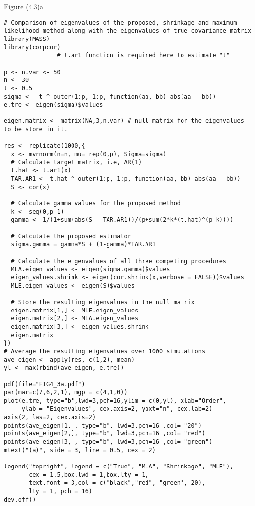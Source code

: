 Figure (4.3)a
\begin{lstlisting}
# Comparison of eigenvalues of the proposed, shrinkage and maximum likelihood method along with the eigenvalues of true covariance matrix 
library(MASS)
library(corpcor)
               # t.ar1 function is required here to estimate "t"

p <- n.var <- 50
n <- 30
t <- 0.5
sigma <-  t ^ outer(1:p, 1:p, function(aa, bb) abs(aa - bb))
e.tre <- eigen(sigma)$values

eigen.matrix <- matrix(NA,3,n.var) # null matrix for the eigenvalues to be store in it.

res <- replicate(1000,{
  x <- mvrnorm(n=n, mu= rep(0,p), Sigma=sigma)
  # Calculate target matrix, i.e, AR(1)
  t.hat <- t.ar1(x)
  TAR.AR1 <- t.hat ^ outer(1:p, 1:p, function(aa, bb) abs(aa - bb))
  S <- cor(x)
  
  # Calculate gamma values for the proposed method
  k <- seq(0,p-1)
  gamma <- 1/(1+sum(abs(S - TAR.AR1))/(p+sum(2*k*(t.hat)^(p-k))))
  
  # Calculate the proposed estimator
  sigma.gamma = gamma*S + (1-gamma)*TAR.AR1
  
  # Calculate the eigenvalues of all three competing procedures
  MLA.eigen_values <- eigen(sigma.gamma)$values
  eigen_values.shrink <- eigen(cor.shrink(x,verbose = FALSE))$values
  MLE.eigen_values <- eigen(S)$values
  
  # Store the resulting eigenvalues in the null matrix
  eigen.matrix[1,] <- MLE.eigen_values
  eigen.matrix[2,] <- MLA.eigen_values
  eigen.matrix[3,] <- eigen_values.shrink
  eigen.matrix
})
# Average the resulting eigenvalues over 1000 simulations
ave_eigen <- apply(res, c(1,2), mean)
yl <- max(rbind(ave_eigen, e.tre))

pdf(file="FIG4_3a.pdf")
par(mar=c(7,6,2,1), mgp = c(4,1,0))
plot(e.tre, type="b",lwd=3,pch=16,ylim = c(0,yl), xlab="Order",
     ylab = "Eigenvalues", cex.axis=2, yaxt="n", cex.lab=2)
axis(2, las=2, cex.axis=2)
points(ave_eigen[1,], type="b", lwd=3,pch=16 ,col= "20")
points(ave_eigen[2,], type="b", lwd=3,pch=16 ,col= "red")
points(ave_eigen[3,], type="b", lwd=3,pch=16 ,col= "green")
mtext("(a)", side = 3, line = 0.5, cex = 2)

legend("topright", legend = c("True", "MLA", "Shrinkage", "MLE"),
       cex = 1.5,box.lwd = 1,box.lty = 1,
       text.font = 3,col = c("black","red", "green", 20),
       lty = 1, pch = 16)
dev.off()
\end{lstlisting}

